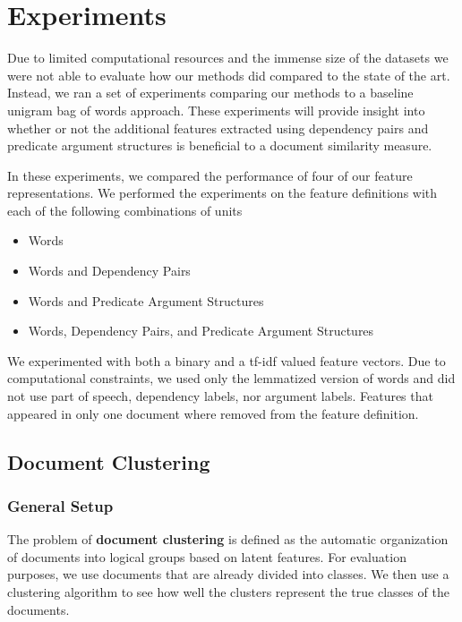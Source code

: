 \documentclass[11pt]{article}
\newcommand{\bt}[1]{\textbf{#1}}
\begin{document}
\section{Experiments}

Due to limited computational resources and the immense size of the datasets we were not able to evaluate how our methods did compared to the state of the art. Instead, we ran a set of experiments comparing our methods to a baseline unigram bag of words approach. These experiments will provide insight into whether or not the additional features extracted using dependency pairs and predicate argument structures is beneficial to a document similarity measure. 

In these experiments, we compared the performance of four of our feature representations. We performed the experiments on the feature definitions with each of the following combinations of units

\begin{itemize}
\item Words
\item Words and Dependency Pairs 
\item Words and Predicate Argument Structures
\item Words, Dependency Pairs, and Predicate Argument Structures
\end{itemize}

We experimented with both a binary and a tf-idf valued feature vectors. Due to computational constraints, we used only the lemmatized version of words and did not use part of speech, dependency labels, nor argument labels. Features that appeared in only one document where removed from the feature definition.


\subsection{Document Clustering} \label{sec:DocumentClusterting}

\subsubsection{General Setup}

The problem of \bt{document clustering} is defined as the automatic organization of documents into logical groups based on latent features. For evaluation purposes, we use documents that are already divided into classes. We then use a clustering algorithm to see how well the clusters represent the true classes of the documents. 
\end{document}
